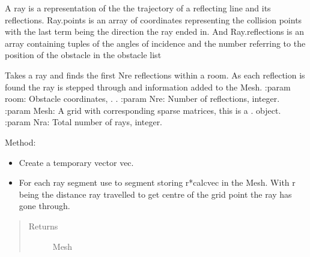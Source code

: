 \documentclass[letterpaper,10pt,english]{sphinxmanual}
\begin{document}
\begin{fulllineitems}
\label{\detokenize{index:Rays.Ray}}
A ray is a representation of the the trajectory of a reflecting   line and its reflections.
Ray.points is an array of co\sphinxhyphen{}ordinates representing
the collision points with the last term being the direction the ray ended in.
And Ray.reflections is an array containing tuples of the angles of incidence
and the number referring to the position of the obstacle in the obstacle list

\begin{fulllineitems}
\label{\detokenize{index:Rays.Ray.mesh_multiref}}
Takes a ray and finds the first Nre reflections within a room.
As each reflection is found the ray is stepped through and
information added to the Mesh.
:param room: Obstacle co\sphinxhyphen{}ordinates, {\hyperref[\detokenize{index:module-Room}]{}}. .
:param Nre: Number of reflections, integer.
:param Mesh: A grid with corresponding sparse matrices, this     is a {\hyperref[\detokenize{index:module-DictionarySparseMatrix}]{}}.  object.
:param Nra: Total number of rays, integer.

Method:
\begin{itemize}
\item {} 
Create a temporary vector vec.

\item {} 
For each ray segment use      to      segment storing r*calcvec in the Mesh. With r being the distance      ray travelled to get  centre of the grid point the ray has gone      through.

\end{itemize}
\begin{quote}\begin{description}
\item[{Returns}] \leavevmode
Mesh


\end{description}
\end{quote}
\end{fulllineitems}
\end{fulllineitems}
\end{document}
